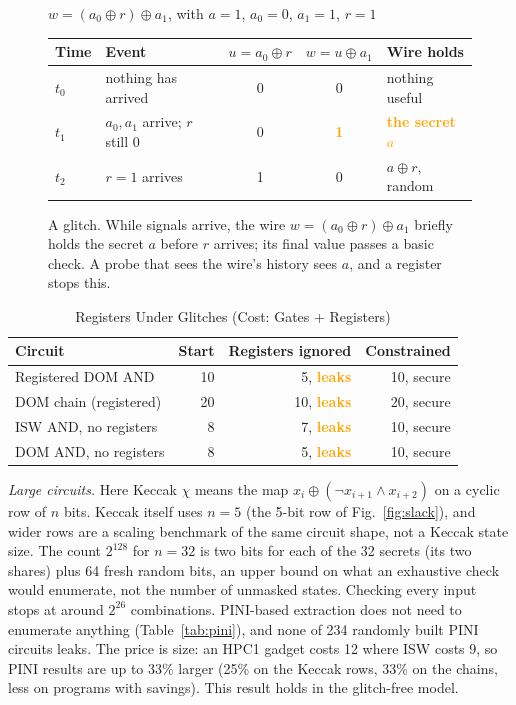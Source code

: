 \documentclass[conference]{IEEEtran}
\newcommand{\bad}{\textcolor{orange}{\textbf{leaks}}}
\newcommand{\ok}{secure}
\begin{document}
\begin{figure}[!t]
\centering
$w=(a_0\oplus r)\oplus a_1$, with $a=1$, $a_0=0$, $a_1=1$, $r=1$\par\smallskip
{\footnotesize\begin{tabularx}{\columnwidth}{@{}l>{\raggedright\arraybackslash}Xccl@{}}
\toprule
Time & Event & $u=a_0\oplus r$ & $w=u\oplus a_1$ & Wire holds\\\midrule
$t_0$ & nothing has arrived & 0 & 0 & nothing useful\\
$t_1$ & $a_0,a_1$ arrive; $r$ still 0 & 0 & \textcolor{orange}{\textbf{1}} & \textcolor{orange}{\textbf{the secret $a$}}\\
$t_2$ & $r=1$ arrives & 1 & 0 & $a\oplus r$, random\\
\bottomrule
\end{tabularx}}
\caption{A glitch. While signals arrive, the wire $w=(a_0\oplus r)\oplus a_1$ briefly holds the secret $a$ before $r$ arrives; its final value passes a basic check. A probe that sees the wire's history sees $a$, and a register stops this.}\label{fig:glitch}
\end{figure}
\begin{table}[t]
\caption{Registers Under Glitches (Cost: Gates + Registers)}\label{tab:glitch}
\centering\footnotesize
\begin{tabular}{@{}lrrr@{}}
\toprule
Circuit & Start & Registers ignored & Constrained\\\midrule
Registered DOM AND & 10 & 5, \bad & 10, \ok\\
DOM chain (registered) & 20 & 10, \bad & 20, \ok\\
ISW AND, no registers & 8 & 7, \bad & 10, \ok\\
DOM AND, no registers & 8 & 5, \bad & 10, \ok\\
\bottomrule
\end{tabular}
\end{table}

\emph{Large circuits.} Here Keccak $\chi$ means the map $x_i\oplus(\neg x_{i+1}\wedge x_{i+2})$ on a cyclic row of $n$ bits. Keccak itself uses $n=5$ (the 5-bit row of Fig.~\ref{fig:slack}), and wider rows are a scaling benchmark of the same circuit shape, not a Keccak state size. The count $2^{128}$ for $n=32$ is two bits for each of the 32 secrets (its two shares) plus 64 fresh random bits, an upper bound on what an exhaustive check would enumerate, not the number of unmasked states. Checking every input stops at around $2^{26}$ combinations. PINI-based extraction does not need to enumerate anything (Table~\ref{tab:pini}), and none of 234 randomly built PINI circuits leaks. The price is size: an HPC1 gadget costs 12 where ISW costs 9, so PINI results are up to 33\% larger (25\% on the Keccak rows, 33\% on the chains, less on programs with savings). This result holds in the glitch-free model.
\end{document}
